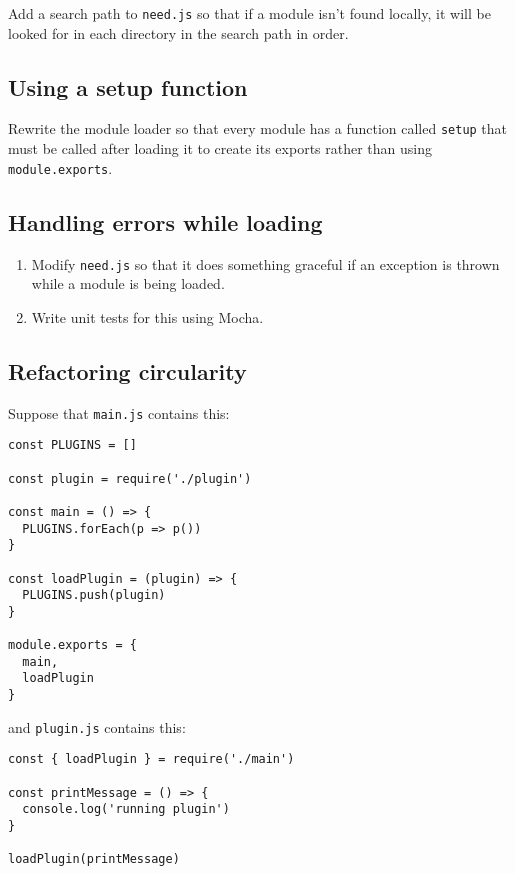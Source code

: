 \documentclass[krantzl]{krantz}
\begin{document}
Add a search path to \texttt{need.js} so that if a module isn’t found locally,
it will be looked for in each directory in the search path in order.

\subsection*{Using a setup function}


Rewrite the module loader so that every module has a function called \texttt{setup}
that must be called after loading it to create its exports
rather than using \texttt{module.exports}.

\subsection*{Handling errors while loading}

\begin{enumerate}

\item 

Modify \texttt{need.js} so that it does something graceful
    if an exception is thrown while a module is being loaded.



\item 

Write unit tests for this using Mocha.



\end{enumerate}

\subsection*{Refactoring circularity}


Suppose that \texttt{main.js} contains this:


\begin{lstlisting}[frame=tblr]
const PLUGINS = []

const plugin = require('./plugin')

const main = () => {
  PLUGINS.forEach(p => p())
}

const loadPlugin = (plugin) => {
  PLUGINS.push(plugin)
}

module.exports = {
  main,
  loadPlugin
}
\end{lstlisting}



\noindent and \texttt{plugin.js} contains this:


\begin{lstlisting}[frame=tblr]
const { loadPlugin } = require('./main')

const printMessage = () => {
  console.log('running plugin')
}

loadPlugin(printMessage)
\end{lstlisting}
\end{document}
